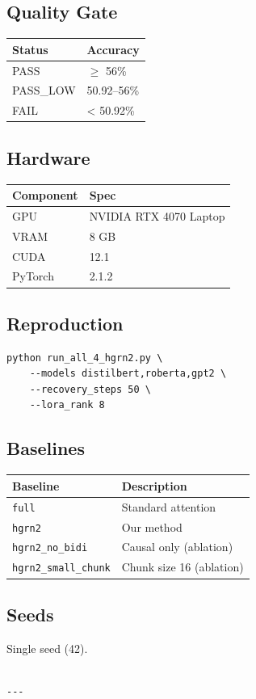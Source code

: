 \subsection{Quality Gate}

\begin{table}[H]
\centering
\small
\begin{tabular}{ll}
\toprule
\textbf{Status} & \textbf{Accuracy} \\
\midrule
PASS & $\ge$ 56\% \\
PASS\_LOW & 50.92--56\% \\
FAIL & < 50.92\% \\
\bottomrule
\end{tabular}
\end{table}

\subsection{Hardware}

\begin{table}[H]
\centering
\small
\begin{tabular}{ll}
\toprule
\textbf{Component} & \textbf{Spec} \\
\midrule
GPU & NVIDIA RTX 4070 Laptop \\
VRAM & 8 GB \\
CUDA & 12.1 \\
PyTorch & 2.1.2 \\
\bottomrule
\end{tabular}
\end{table}

\subsection{Reproduction}

\begin{lstlisting}
python run_all_4_hgrn2.py \
    --models distilbert,roberta,gpt2 \
    --recovery_steps 50 \
    --lora_rank 8
\end{lstlisting}

\subsection{Baselines}

\begin{table}[H]
\centering
\small
\begin{tabular}{ll}
\toprule
\textbf{Baseline} & \textbf{Description} \\
\midrule
\texttt{full} & Standard attention \\
\texttt{hgrn2} & Our method \\
\texttt{hgrn2\_no\_bidi} & Causal only (ablation) \\
\texttt{hgrn2\_small\_chunk} & Chunk size 16 (ablation) \\
\bottomrule
\end{tabular}
\end{table}

\subsection{Seeds}

Single seed (42).
\begin{lstlisting}

---
\end{lstlisting}